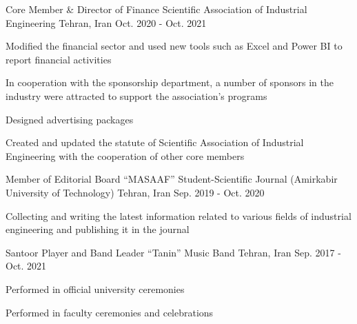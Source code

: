 

\begin{cventries}

  \cventry
    {Core Member \& Director of Finance} %
    {Scientific Association of Industrial Engineering} %
    {Tehran, Iran} %
    {Oct. 2020 - Oct. 2021} %
    {
      \begin{cvitems} %
        \item {Modified the financial sector and used new tools such as Excel and Power BI to report financial activities}
        \item {In cooperation with the sponsorship department, a number of sponsors in the industry were attracted to support the association's programs}
        \item {Designed advertising packages}
        \item {Created and updated the statute of Scientific Association of Industrial Engineering with the cooperation of other core members}
      \end{cvitems}
    }

  \cventry
    {Member of Editorial Board} %
    {``MASAAF'' Student-Scientific Journal (Amirkabir University of Technology)} %
    {Tehran, Iran} %
    {Sep. 2019 - Oct. 2020} %
    {
      \begin{cvitems} %
    \item{Collecting and writing the latest information related to various fields of industrial engineering and publishing it in the journal}
      \end{cvitems}
    }

  \cventry
    {Santoor Player and Band Leader} %
    {``Tanin'' Music Band} %
    {Tehran, Iran} %
    {Sep. 2017 - Oct. 2021} %
    {
      \begin{cvitems} %
        \item {Performed in official university ceremonies}
        \item {Performed in faculty ceremonies and celebrations}
      \end{cvitems}
    }
    
\end{cventries}
